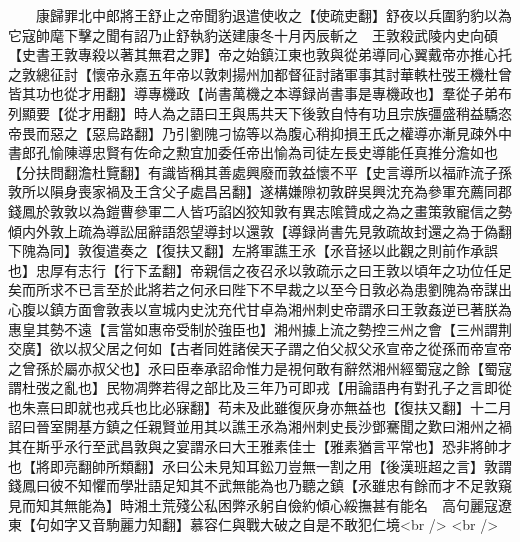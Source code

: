 　　康歸罪北中郎將王舒止之帝聞豹退遣使收之【使疏吏翻】舒夜以兵圍豹豹以為它寇帥麾下擊之聞有詔乃止舒執豹送建康冬十月丙辰斬之　王敦殺武陵内史向碩【史書王敦專殺以著其無君之罪】帝之始鎮江東也敦與從弟導同心翼戴帝亦推心托之敦總征討【懷帝永嘉五年帝以敦刺揚州加都督征討諸軍事其討華軼杜弢王機杜曾皆其功也從才用翻】導專機政【尚書萬機之本導録尚書事是專機政也】羣從子弟布列顯要【從才用翻】時人為之語曰王與馬共天下後敦自恃有功且宗族彊盛稍益驕恣帝畏而惡之【惡烏路翻】乃引劉隗刁協等以為腹心稍抑損王氏之權導亦漸見疎外中書郎孔愉陳導忠賢有佐命之勲宜加委任帝出愉為司徒左長史導能任真推分澹如也【分扶問翻澹杜覽翻】有識皆稱其善處興廢而敦益懷不平【史言導所以福祚流子孫敦所以隕身喪家禍及王含父子處昌呂翻】遂構嫌隙初敦辟吳興沈充為參軍充薦同郡錢鳳於敦敦以為鎧曹參軍二人皆巧諂凶狡知敦有異志隂贊成之為之畫策敦寵信之勢傾内外敦上疏為導訟屈辭語怨望導封以還敦【導録尚書先見敦疏故封還之為于偽翻下隗為同】敦復遣奏之【復扶又翻】左將軍譙王氶【氶音拯以此觀之則前作承誤也】忠厚有志行【行下孟翻】帝親信之夜召氶以敦疏示之曰王敦以頃年之功位任足矣而所求不已言至於此將若之何氶曰陛下不早裁之以至今日敦必為患劉隗為帝謀出心腹以鎮方面會敦表以宣城内史沈充代甘卓為湘州刺史帝謂氶曰王敦姦逆已著朕為惠皇其勢不遠【言當如惠帝受制於強臣也】湘州據上流之勢控三州之會【三州謂荆交廣】欲以叔父居之何如【古者同姓諸侯天子謂之伯父叔父氶宣帝之從孫而帝宣帝之曾孫於屬亦叔父也】氶曰臣奉承詔命惟力是視何敢有辭然湘州經蜀寇之餘【蜀寇謂杜弢之亂也】民物凋弊若得之部比及三年乃可即戎【用論語冉有對孔子之言即從也朱熹曰即就也戎兵也比必寐翻】苟未及此雖復灰身亦無益也【復扶又翻】十二月詔曰晉室開基方鎮之任親賢並用其以譙王氶為湘州刺史長沙鄧騫聞之歎曰湘州之禍其在斯乎氶行至武昌敦與之宴謂氶曰大王雅素佳士【雅素猶言平常也】恐非將帥才也【將即亮翻帥所類翻】氶曰公未見知耳鈆刀豈無一割之用【後漢班超之言】敦謂錢鳳曰彼不知懼而學壯語足知其不武無能為也乃聽之鎮【氶雖忠有餘而才不足敦窺見而知其無能為】時湘土荒殘公私困弊氶躬自儉約傾心綏撫甚有能名　高句麗寇遼東【句如字又音駒麗力知翻】慕容仁與戰大破之自是不敢犯仁境<br />
<br />
